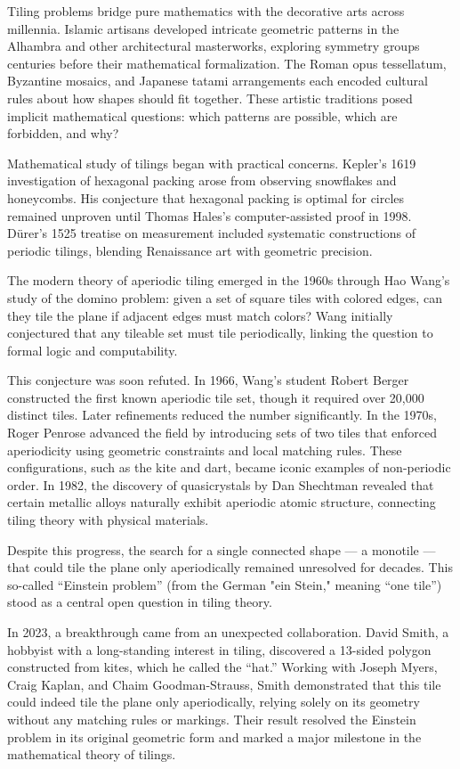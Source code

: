 \begin{historical}
Tiling problems bridge pure mathematics with the decorative arts across millennia. Islamic artisans developed intricate geometric patterns in the Alhambra and other architectural masterworks, exploring symmetry groups centuries before their mathematical formalization. The Roman opus tessellatum, Byzantine mosaics, and Japanese tatami arrangements each encoded cultural rules about how shapes should fit together. These artistic traditions posed implicit mathematical questions: which patterns are possible, which are forbidden, and why?

Mathematical study of tilings began with practical concerns. Kepler's 1619 investigation of hexagonal packing arose from observing snowflakes and honeycombs. His conjecture that hexagonal packing is optimal for circles remained unproven until Thomas Hales's computer-assisted proof in 1998. Dürer's 1525 treatise on measurement included systematic constructions of periodic tilings, blending Renaissance art with geometric precision.

The modern theory of aperiodic tiling emerged in the 1960s through Hao Wang's study of the domino problem: given a set of square tiles with colored edges, can they tile the plane if adjacent edges must match colors? Wang initially conjectured that any tileable set must tile periodically, linking the question to formal logic and computability.

This conjecture was soon refuted. In 1966, Wang’s student Robert Berger constructed the first known aperiodic tile set, though it required over 20,000 distinct tiles. Later refinements reduced the number significantly. In the 1970s, Roger Penrose advanced the field by introducing sets of two tiles that enforced aperiodicity using geometric constraints and local matching rules. These configurations, such as the kite and dart, became iconic examples of non-periodic order. In 1982, the discovery of quasicrystals by Dan Shechtman revealed that certain metallic alloys naturally exhibit aperiodic atomic structure, connecting tiling theory with physical materials.

Despite this progress, the search for a single connected shape — a monotile — that could tile the plane only aperiodically remained unresolved for decades. This so-called “Einstein problem” (from the German "ein Stein," meaning “one tile”) stood as a central open question in tiling theory.

In 2023, a breakthrough came from an unexpected collaboration. David Smith, a hobbyist with a long-standing interest in tiling, discovered a 13-sided polygon constructed from kites, which he called the “hat.” Working with Joseph Myers, Craig Kaplan, and Chaim Goodman-Strauss, Smith demonstrated that this tile could indeed tile the plane only aperiodically, relying solely on its geometry without any matching rules or markings. Their result resolved the Einstein problem in its original geometric form and marked a major milestone in the mathematical theory of tilings.
\end{historical}
